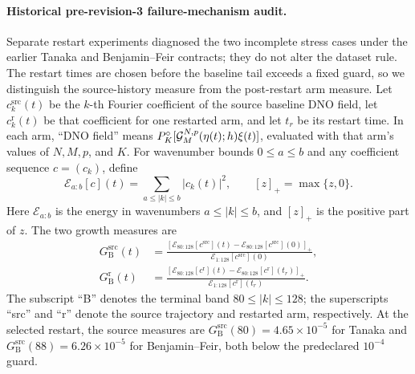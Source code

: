 \paragraph{Historical pre-revision-3 failure-mechanism audit.}
Separate restart experiments diagnosed the two incomplete stress cases under
the earlier Tanaka and Benjamin--Feir contracts; they do not alter the dataset
rule.  The restart times are chosen before the
baseline tail exceeds a fixed guard, so we
distinguish the source-history measure from the post-restart arm measure.  Let
\(c_k^{\mathrm{src}}(t)\) be the \(k\)-th Fourier coefficient of the source
baseline DNO field, let \(c_k^{\mathrm r}(t)\) be that coefficient for one
restarted arm, and let \(t_r\) be its restart time.  In each arm, ``DNO field''
means \(P_K^\circ[\mathcal{G}_M^{N,p}(\eta(t);h)\xi(t)]\), evaluated with that arm's
values of \(N,M,p\), and \(K\).  For wavenumber bounds \(0\leq a\leq b\) and
any coefficient sequence \(c=(c_k)\), define
\[
  \mathcal E_{a:b}[c](t)=\sum_{a\leq |k|\leq b}|c_k(t)|^2,
  \qquad
  [z]_+=\max\{z,0\}.
\]
Here \(\mathcal E_{a:b}\) is the energy in wavenumbers
\(a\leq|k|\leq b\), and \([z]_+\) is the positive part of \(z\).  The two
growth measures are
\begin{align}
  G_{\mathrm B}^{\mathrm{src}}(t)
  &=
  \frac{
    [\mathcal E_{80:128}[c^{\mathrm{src}}](t)
     -\mathcal E_{80:128}[c^{\mathrm{src}}](0)]_+
  }{
    \mathcal E_{1:128}[c^{\mathrm{src}}](0)
  },
  \label{eq:paper-source-high-band-growth}\\
  G_{\mathrm B}^{\mathrm r}(t)
  &=
  \frac{
    [\mathcal E_{80:128}[c^{\mathrm r}](t)
     -\mathcal E_{80:128}[c^{\mathrm r}](t_r)]_+
  }{
    \mathcal E_{1:128}[c^{\mathrm r}](t_r)
  }.
  \label{eq:paper-high-band-growth}
\end{align}
The subscript ``B'' denotes the terminal band \(80\leq|k|\leq128\); the
superscripts ``src'' and ``r'' denote the source trajectory and restarted arm,
respectively.  At the selected restart, the source measures are
\(G_{\mathrm B}^{\mathrm{src}}(80)=4.65\times10^{-5}\) for Tanaka and
\(G_{\mathrm B}^{\mathrm{src}}(88)=6.26\times10^{-5}\) for
Benjamin--Feir, both below the predeclared \(10^{-4}\) guard.

